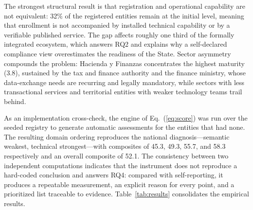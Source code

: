 \documentclass[runningheads]{llncs}
\begin{document}
The strongest structural result is that registration and operational
capability are not equivalent: 32\% of the registered entities remain at the
initial level, meaning that enrollment is not accompanied by installed
technical capability or by a verifiable published service. The gap affects
roughly one third of the formally integrated ecosystem, which answers RQ2 and
explains why a self-declared compliance view overestimates the readiness of
the State. Sector asymmetry compounds the problem: Hacienda y Finanzas
concentrates the highest maturity (3.8), sustained by the tax and finance
authority and the finance ministry, whose data-exchange needs are recurring
and legally mandatory, while sectors with less transactional services and
territorial entities with weaker technology teams trail behind.

\begin{sloppypar}
As an implementation cross-check, the engine of Eq.~(\ref{eq:score}) was run
over the seeded registry to generate automatic assessments for the entities
that had none. The resulting domain ordering reproduces the national
diagnosis---semantic weakest, technical strongest---with composites of 45.3,
49.3, 55.7, and 58.3 respectively and an overall composite of 52.1. The
consistency between two independent computations indicates that the
instrument does not reproduce a hard-coded conclusion and answers RQ4:
compared with self-reporting, it produces a repeatable measurement, an
explicit reason for every point, and a prioritized list traceable to
evidence. Table~\ref{tab:results} consolidates the empirical results.
\end{sloppypar}
\end{document}
